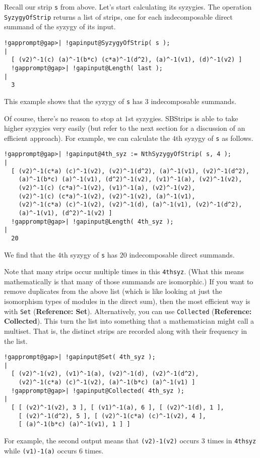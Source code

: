 \documentclass[a4paper,11pt]{report}
\begin{document}
{{ Recall our strip \texttt{s} from above. Let's start calculating its syzygies. The operation \texttt{SyzygyOfStrip} returns a list of strips, one for each indecomposable direct summand of the
syzygy of its input. 
\begin{Verbatim}[commandchars=!@|,fontsize=\small,frame=single,label=Example]
  !gapprompt@gap>| !gapinput@SyzygyOfStrip( s );
|
  [ (v2)^-1(c) (a)^-1(b*c) (c*a)^-1(d^2), (a)^-1(v1), (d)^-1(v2) ]
  !gapprompt@gap>| !gapinput@Length( last );
|
  3
\end{Verbatim}
 This example shows that the syzygy of \texttt{s} has $3$ indecomposable summands. 

 Of course, there's no reason to stop at $1$st syzygies. \textsf{SBStrips} is able to take higher syzygies very easily (but refer to the next section for
a discussion of an efficient approach). For example, we can calculate the $4$th syzygy of \texttt{s} as follows. 
\begin{Verbatim}[commandchars=!@|,fontsize=\small,frame=single,label=Example]
  !gapprompt@gap>| !gapinput@4th_syz := NthSyzygyOfStrip( s, 4 );
|
  [ (v2)^-1(c*a) (c)^-1(v2), (v2)^-1(d^2), (a)^-1(v1), (v2)^-1(d^2),
    (a)^-1(b*c) (a)^-1(v1), (d^2)^-1(v2), (v1)^-1(a), (v2)^-1(v2),
    (v2)^-1(c) (c*a)^-1(v2), (v1)^-1(a), (v2)^-1(v2),
    (v2)^-1(c) (c*a)^-1(v2), (v2)^-1(v2), (a)^-1(v1),
    (v2)^-1(c*a) (c)^-1(v2), (v2)^-1(d), (a)^-1(v1), (v2)^-1(d^2),
    (a)^-1(v1), (d^2)^-1(v2) ]
  !gapprompt@gap>| !gapinput@Length( 4th_syz );
|
  20
\end{Verbatim}
 We find that the $4$th syzygy of \texttt{s} has $20$ indecomposable direct summands. 

 Note that many strips occur multiple times in this \texttt{4th{\textunderscore}syz}. (What this means mathematically is that many of those summands are
isomorphic.) If you want to remove duplicates from the above list (which is
like looking at just the isomorphism types of modules in the direct sum), then
the most efficient way is with \texttt{Set} (\textbf{Reference: Set}). Alternatively, you can use \texttt{Collected} (\textbf{Reference: Collected}). This turn the list into something that a mathematician might call a
multiset. That is, the distinct strips are recorded along with their frequency
in the list. 
\begin{Verbatim}[commandchars=!@|,fontsize=\small,frame=single,label=Example]
  !gapprompt@gap>| !gapinput@Set( 4th_syz );
|
  [ (v2)^-1(v2), (v1)^-1(a), (v2)^-1(d), (v2)^-1(d^2),
    (v2)^-1(c*a) (c)^-1(v2), (a)^-1(b*c) (a)^-1(v1) ]
  !gapprompt@gap>| !gapinput@Collected( 4th_syz );
|
  [ [ (v2)^-1(v2), 3 ], [ (v1)^-1(a), 6 ], [ (v2)^-1(d), 1 ],
    [ (v2)^-1(d^2), 5 ], [ (v2)^-1(c*a) (c)^-1(v2), 4 ],
    [ (a)^-1(b*c) (a)^-1(v1), 1 ] ]
\end{Verbatim}
 For example, the second output means that \texttt{(v2)\texttt{}-1(v2)} occurs $3$ times in \texttt{4th{\textunderscore}syz} while \texttt{(v1)\texttt{}-1(a)} occurs $6$ times. 

}}
\end{document}
